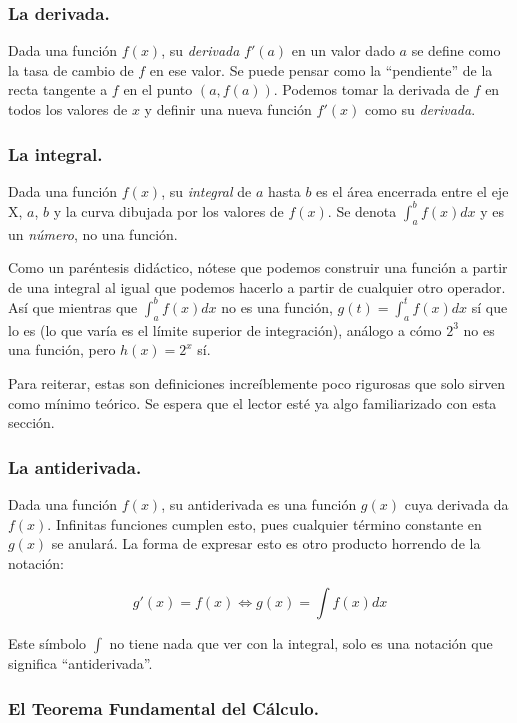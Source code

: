 \subsubsection{La derivada.}

Dada una función $f(x)$, su \textit{derivada} $f'(a)$ en un valor dado $a$ se define como la tasa de cambio de $f$ en ese valor. Se puede pensar como la \enquote{pendiente} de la recta tangente a $f$ en el punto $(a, f(a))$. Podemos tomar la derivada de $f$ en todos los valores de $x$ y definir una nueva función $f'(x)$ como su \textit{derivada}.

\subsubsection{La integral.}

Dada una función $f(x)$, su \textit{integral} de $a$ hasta $b$ es el área encerrada entre el eje X, $a$, $b$ y la curva dibujada por los valores de $f(x)$. Se denota $\int_{a}^{b} f(x) dx$ y es un \textit{número}, no una función.

Como un paréntesis didáctico, nótese que podemos construir una función a partir de una integral al igual que podemos hacerlo a partir de cualquier otro operador. Así que mientras que $\int_a^b f(x) dx$ no es una función, $g(t) = \int_a^t f(x) dx$ sí que lo es (lo que varía es el límite superior de integración), análogo a cómo $2^3$ no es una función, pero $h(x) = 2^x$ sí.

Para reiterar, estas son definiciones increíblemente poco rigurosas que solo sirven como mínimo teórico. Se espera que el lector esté ya algo familiarizado con esta sección.

\subsubsection{La antiderivada.}

Dada una función $f(x)$, su antiderivada es una función $g(x)$ cuya derivada da $f(x)$. Infinitas funciones cumplen esto, pues cualquier término constante en $g(x)$ se anulará. La forma de expresar esto es otro producto horrendo de la notación:

$$g'(x) = f(x) \iff g(x) = \int f(x) dx$$

Este símbolo $\int$ no tiene nada que ver con la integral, solo es una notación que significa \enquote{antiderivada}.

\subsubsection{El Teorema Fundamental del Cálculo.}

